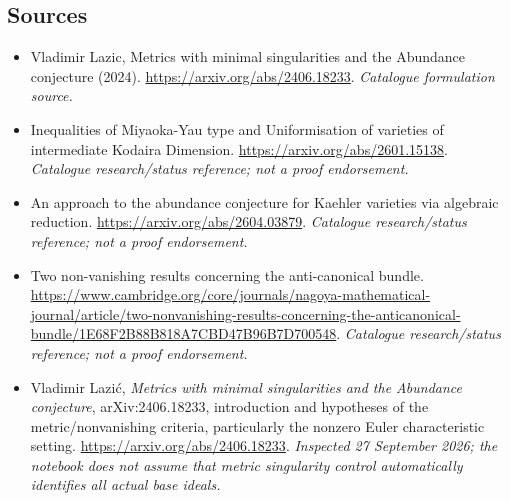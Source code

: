 \documentclass[11pt,a4paper]{article}
\numberwithin{equation}{section}
\begin{document}
\subsection{Sources}
\begin{itemize}\raggedright
\item[\textnormal{[S1]}]\hypertarget{source:78:1}{} Vladimir Lazic, Metrics with minimal singularities and the Abundance conjecture (2024).
\url{https://arxiv.org/abs/2406.18233}.
{\small\textit{Catalogue formulation source.}}
\item[\textnormal{[S2]}]\hypertarget{source:78:2}{} Inequalities of Miyaoka-Yau type and Uniformisation of varieties of intermediate Kodaira Dimension.
\url{https://arxiv.org/abs/2601.15138}.
{\small\textit{Catalogue research/status reference; not a proof endorsement.}}
\item[\textnormal{[S3]}]\hypertarget{source:78:3}{} An approach to the abundance conjecture for Kaehler varieties via algebraic reduction.
\url{https://arxiv.org/abs/2604.03879}.
{\small\textit{Catalogue research/status reference; not a proof endorsement.}}
\item[\textnormal{[S4]}]\hypertarget{source:78:4}{} Two non-vanishing results concerning the anti-canonical bundle.
\url{https://www.cambridge.org/core/journals/nagoya-mathematical-journal/article/two-nonvanishing-results-concerning-the-anticanonical-bundle/1E68F2B88B818A7CBD47B96B7D700548}.
{\small\textit{Catalogue research/status reference; not a proof endorsement.}}
\item[\textnormal{[E1]}]\hypertarget{extra:78:1}{} Vladimir Lazi\'c,
\emph{Metrics with minimal singularities and the Abundance conjecture},
arXiv:2406.18233, introduction and hypotheses of the metric/nonvanishing
criteria, particularly the nonzero Euler characteristic setting.
\url{https://arxiv.org/abs/2406.18233}.
{\small\textit{Inspected 27 September 2026; the notebook does not assume
that metric singularity control automatically identifies all actual base ideals.}}
\end{itemize}
\end{document}
